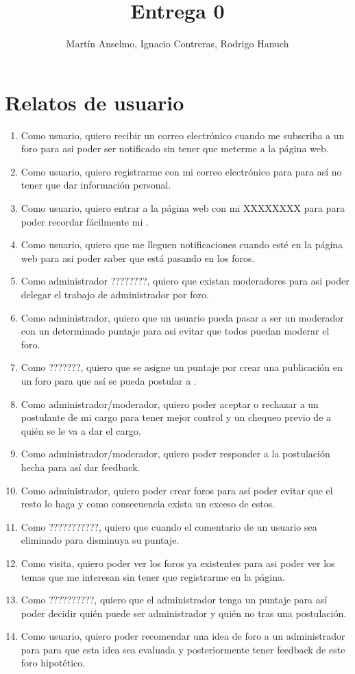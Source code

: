 \documentclass[12pt, letterpaper, notitlepage]{article}
\title{\textbf{Entrega 0}}
\author{Martín Anselmo, Ignacio Contreras, Rodrigo Hanuch}
\begin{document}
\clearpage\maketitle
\thispagestyle{empty}

\newpage

\section*{Relatos de usuario}
\newcommand{\story}[3]{Como {#1}, quiero {#2} para {#3}.}

\begin{enumerate}
	\item \story{usuario}{recibir un correo electrónico cuando me subscriba a un foro}	
		{asi poder ser notificado sin tener que meterme a la página web}
	\item \story{usuario}{registrarme con mi correo electrónico}{para así no tener que 		dar información personal}
	\item \story{usuario}{entrar a la página web con mi XXXXXXXX}{para poder recordar 			fácilmente mi \say{log-in}}
	\item \story{usuario}{que me lleguen notificaciones cuando esté en la página web}				{asi poder saber que está pasando en los foros}
	\item \story{administrador ????????}{que existan moderadores}{asi poder delegar el 		trabajo de administrador por foro}
	\item \story{administrador}{que un usuario pueda pasar a ser un moderador con un
		determinado puntaje}{asi evitar que todos puedan moderar el foro}
	\item \story{???????}{que se asigne un puntaje por crear una publicación en un 				foro}{que así se pueda postular a \say{mejores cargos}}
	\item \story{administrador/moderador}{poder aceptar o rechazar a un postulante de 			mi cargo}{tener mejor control y un chequeo previo de a quién se le va a dar el 		cargo}
	\item \story{administrador/moderador}{poder responder a la postulación hecha}{así 			dar feedback}
	\item \story{administrador}{poder crear foros}{así poder evitar que el resto lo 				haga y como consecuencia exista un exceso de estos}
	\item \story{???????????}{que cuando el comentario de un usuario sea eliminado}				{disminuya su puntaje}
	\item \story{visita}{poder ver los foros ya existentes}{asi poder ver los temas 				que me interesan sin tener que registrarme en la página}
	\item \story{??????????}{que el administrador tenga un puntaje}{así poder decidir 			quién puede ser administrador y quién no tras una postulación}
	\item \story{usuario}{poder recomendar una idea de foro a un administrador}{para 				que esta idea sea evaluada y posteriormente tener feedback de este foro 					hipotético}
\end{enumerate}
\end{document}
